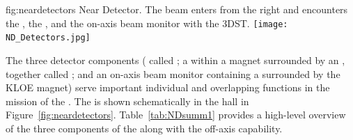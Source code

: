 \begin{dunefigure}
{fig:neardetectors}
{ Near Detector. The beam enters from the right and encounters
the , the , and the on-axis beam monitor with the 3DST.}
\texttt{[image: ND\_Detectors.jpg]}
\end{dunefigure}

The three detector components ( called ; a  within a magnet surrounded by an , together called ; and an on-axis beam monitor containing a  surrounded by the KLOE magnet)  serve important individual and overlapping functions in the mission of the . 
The   is shown schematically in the   hall in Figure~\ref{fig:neardetectors}.  
Table~\ref{tab:NDsumm1} provides a high-level overview of the three components of the   along with the off-axis capability.  

